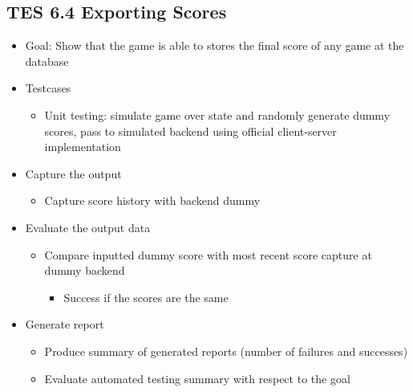 \subsection{TES 6.4 Exporting Scores}
\begin{itemize}
\item Goal: Show that the game is able to stores the final score of any game at the database 

\item Testcases
\begin{itemize}
\item Unit testing: simulate game over state and randomly generate dummy scores, pass to simulated backend using official client-server implementation
\end{itemize}

\item Capture the output
\begin{itemize}
\item Capture score history with backend dummy
\end{itemize}

\item Evaluate the output data
\begin{itemize}
\item Compare inputted dummy score with most recent score capture at dummy backend
\begin{itemize}
\item Success if the scores are the same
\end{itemize}
\end{itemize}

\item Generate report
\begin{itemize}
\item Produce summary of generated reports (number of failures and successes)
\item Evaluate automated testing summary with respect to the goal
\end{itemize}
\end{itemize}



